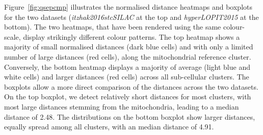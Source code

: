 \documentclass[12pt]{article}\usepackage[]{graphicx}\usepackage[]{color}
\begin{document}
Figure~\ref{fig:qsepcmp} illustrates the normalised distance heatmaps
and boxplots for the two datasets (\textit{itzhak2016stcSILAC} at the
top and \textit{hyperLOPIT2015} at the bottom). The two heatmaps, that
have been rendered using the same colour-scale, display strikingly
different colour patterns. The top heatmap shows a majority of small
normalised distances (dark blue cells) and with only a limited number
of large distances (red cells), along the mitochondrial reference
cluster. Conversely, the bottom heatmap displays a majority of average
(light blue and white cells) and larger distances (red cells) across
all sub-cellular clusters. The boxplots allow a more direct comparison
of the distances across the two datasets. On the top boxplot, we
detect relatively short distances for most clusters, with most large
distances stemming from the mitochondria, leading to a median distance
of 2.48. The distributions on the bottom boxplot
show larger distances, equally spread among all clusters, with an
median distance of 4.91.
\end{document}
